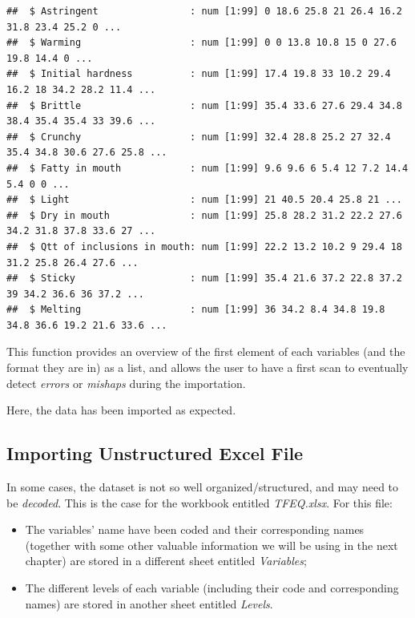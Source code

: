 \documentclass[
]{book}
\providecommand{\tightlist}{%
  \setlength{\itemsep}{0pt}\setlength{\parskip}{0pt}}
\begin{document}
\begin{verbatim}
##  $ Astringent                : num [1:99] 0 18.6 25.8 21 26.4 16.2 31.8 23.4 25.2 0 ...
##  $ Warming                   : num [1:99] 0 0 13.8 10.8 15 0 27.6 19.8 14.4 0 ...
##  $ Initial hardness          : num [1:99] 17.4 19.8 33 10.2 29.4 16.2 18 34.2 28.2 11.4 ...
##  $ Brittle                   : num [1:99] 35.4 33.6 27.6 29.4 34.8 38.4 35.4 35.4 33 39.6 ...
##  $ Crunchy                   : num [1:99] 32.4 28.8 25.2 27 32.4 35.4 34.8 30.6 27.6 25.8 ...
##  $ Fatty in mouth            : num [1:99] 9.6 9.6 6 5.4 12 7.2 14.4 5.4 0 0 ...
##  $ Light                     : num [1:99] 21 40.5 20.4 25.8 21 ...
##  $ Dry in mouth              : num [1:99] 25.8 28.2 31.2 22.2 27.6 34.2 31.8 37.8 33.6 27 ...
##  $ Qtt of inclusions in mouth: num [1:99] 22.2 13.2 10.2 9 29.4 18 31.2 25.8 26.4 27.6 ...
##  $ Sticky                    : num [1:99] 35.4 21.6 37.2 22.8 37.2 39 34.2 36.6 36 37.2 ...
##  $ Melting                   : num [1:99] 36 34.2 8.4 34.8 19.8 34.8 36.6 19.2 21.6 33.6 ...
\end{verbatim}

This function provides an overview of the first element of each variables (and the format they are in) as a list, and allows the user to have a first scan to eventually detect \emph{errors} or \emph{mishaps} during the importation.

Here, the data has been imported as expected.

\hypertarget{importing-unstructured-excel-file}{%
\subsection{Importing Unstructured Excel File}\label{importing-unstructured-excel-file}}

In some cases, the dataset is not so well organized/structured, and may need to be \emph{decoded}. This is the case for the workbook entitled \emph{TFEQ.xlsx}. For this file:

\begin{itemize}
\tightlist
\item
  The variables' name have been coded and their corresponding names (together with some other valuable information we will be using in the next chapter) are stored in a different sheet entitled \emph{Variables};
\item
  The different levels of each variable (including their code and corresponding names) are stored in another sheet entitled \emph{Levels}.
\end{itemize}
\end{document}
